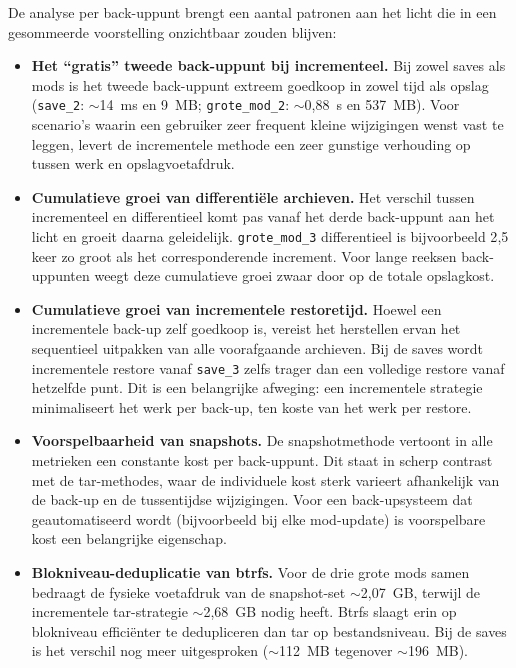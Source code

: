 De analyse per back-uppunt brengt een aantal patronen aan het licht die in een gesommeerde voorstelling onzichtbaar zouden blijven:

\begin{itemize}
    \item \textbf{Het ``gratis'' tweede back-uppunt bij incrementeel.} Bij zowel saves als mods is het tweede back-uppunt extreem goedkoop in zowel tijd als opslag (\texttt{save\_2}: $\sim$14~ms en 9~MB; \texttt{grote\_mod\_2}: $\sim$0{,}88~s en 537~MB). Voor scenario's waarin een gebruiker zeer frequent kleine wijzigingen wenst vast te leggen, levert de incrementele methode een zeer gunstige verhouding op tussen werk en opslagvoetafdruk.
    \item \textbf{Cumulatieve groei van differentiële archieven.} Het verschil tussen incrementeel en differentieel komt pas vanaf het derde back-uppunt aan het licht en groeit daarna geleidelijk. \texttt{grote\_mod\_3} differentieel is bijvoorbeeld 2{,}5 keer zo groot als het corresponderende increment. Voor lange reeksen back-uppunten weegt deze cumulatieve groei zwaar door op de totale opslagkost.
    \item \textbf{Cumulatieve groei van incrementele restoretijd.} Hoewel een incrementele back-up zelf goedkoop is, vereist het herstellen ervan het sequentieel uitpakken van alle voorafgaande archieven. Bij de saves wordt incrementele restore vanaf \texttt{save\_3} zelfs trager dan een volledige restore vanaf hetzelfde punt. Dit is een belangrijke afweging: een incrementele strategie minimaliseert het werk per back-up, ten koste van het werk per restore.
    \item \textbf{Voorspelbaarheid van snapshots.} De snapshotmethode vertoont in alle metrieken een constante kost per back-uppunt. Dit staat in scherp contrast met de tar-methodes, waar de individuele kost sterk varieert afhankelijk van de back-up en de tussentijdse wijzigingen. Voor een back-upsysteem dat geautomatiseerd wordt (bijvoorbeeld bij elke mod-update) is voorspelbare kost een belangrijke eigenschap.
    \item \textbf{Blokniveau-deduplicatie van btrfs.} Voor de drie grote mods samen bedraagt de fysieke voetafdruk van de snapshot-set $\sim$2{,}07~GB, terwijl de incrementele tar-strategie $\sim$2{,}68~GB nodig heeft. Btrfs slaagt erin op blokniveau efficiënter te dedupliceren dan tar op bestandsniveau. Bij de saves is het verschil nog meer uitgesproken ($\sim$112~MB tegenover $\sim$196~MB).
\end{itemize}

